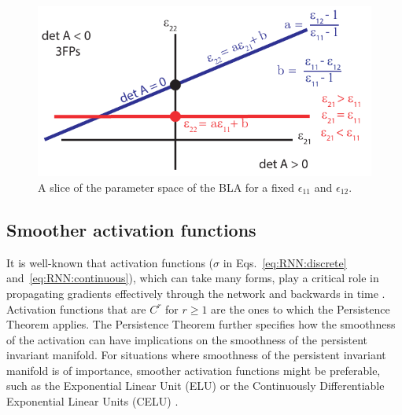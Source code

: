 \documentclass{article} %
\newcounter{ct}
\theoremstyle{definition}
\theoremstyle{remark}
\begin{document}
\begin{figure}[H]
  \centering
  \includegraphics[width=\textwidth]{bla_parameter_space}
  \caption{A slice of the parameter space of the BLA for a fixed \(\epsilon_{11}\) and \(\epsilon_{12}\). %
  }\label{fig:blaparameterspace}
\end{figure}



\subsection{Smoother activation functions}
It is well-known that activation functions (\(\sigma\) in  Eqs.~\ref{eq:RNN:discrete} and~\ref{eq:RNN:continuous}), which can take many forms, play a critical role in propagating gradients effectively through the network and backwards in time \citep{jagtap2023,ramachandran2017,hayou2019}.
Activation functions that are \(C^{r}\) for \(r\geq 1\) are the ones to which the Persistence Theorem applies.
The Persistence Theorem further specifies how the smoothness of the activation can have implications on the smoothness of the persistent invariant manifold.
For situations where smoothness of the persistent invariant manifold is of importance, smoother activation functions might be preferable, such as the Exponential Linear Unit (ELU)\citep{clevert2015} or the Continuously Differentiable Exponential Linear Units (CELU) \citep{barron2017}.








\end{document}
